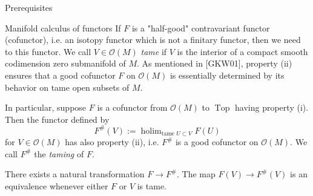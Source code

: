 \documentclass[12pt]{amsart}
\newcommand{\holim}{\operatorname{holim}}
\newcommand{\Top}{\operatorname{Top}}
\theoremstyle{plain}
\theoremstyle{definition}
\theoremstyle{remark}
\begin{document}
\begin{section}{Prerequisites}
\begin{subsection}{Manifold calculus of functors}
If $F$ is a "half-good" contravariant functor (cofunctor), i.e. an isotopy functor which is not a finitary functor, then we need to  this functor. We call $V \in \mathcal{O}(M)$ \textit{tame} if $V$ is the interior of a compact smooth codimension zero submanifold of $M$. As mentioned in [GKW01], property (ii) ensures that a good cofunctor $F$ on $\mathcal{O}(M)$ is essentially determined by its behavior on tame open subsets of $M$.

In particular, suppose $F$ is a cofunctor from $\mathcal{O}(M)$ to $\Top$ having property (i). Then the functor defined by $$F^{\#}(V):=\holim_{\text{tame } U \subset V} F(U)$$ for $V \in \mathcal{O}(M)$ has also property (ii), i.e. $F^{\#}$ is a good cofunctor on $\mathcal{O}(M)$. We call $F^{\#}$ the \textit{taming} of $F$.

There exists a natural transformation $F \to F^{\#}$. The map $F(V)\to F^{\#}(V)$ is an equivalence whenever either $F$ or $V$ is tame. 


\end{subsection}
\end{section}
\end{document}
